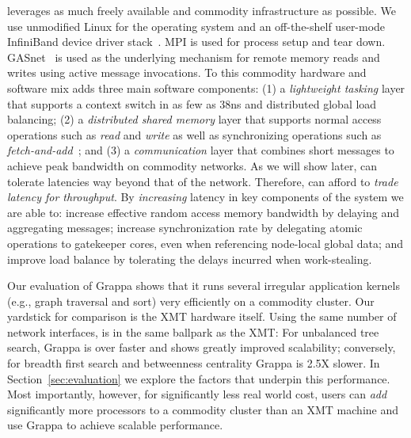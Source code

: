 \Grappa leverages as much freely available and commodity infrastructure as
possible. We use unmodified Linux for the operating system and an
off-the-shelf user-mode InfiniBand device driver stack~\cite{OFED}. MPI is
used for process setup and tear down. GASnet~\cite{gasnet} is used as the
underlying mechanism for remote memory reads and writes using active message
invocations. To this commodity hardware and software mix \Grappa adds three
main software components: (1) a \emph{lightweight tasking\/} layer that
supports a context switch in as few as 38ns and distributed global load
balancing; (2) a \emph{distributed shared memory\/} layer that supports normal
access operations such as \emph{read\/} and \emph{write\/} as well as
synchronizing operations such as \emph{fetch-and-add\/}~\cite{fetchandadd};
and (3) a \emph{communication\/} layer that combines short messages to
achieve peak bandwidth on commodity networks. As we will show later, \Grappa
can tolerate latencies way beyond that of the network. Therefore, \Grappa can
afford to \emph{trade latency for throughput}. By {\em increasing\/} latency
in key components of the system we are able to: increase effective random
access memory bandwidth by delaying and aggregating messages; increase
synchronization rate by delegating atomic operations to gatekeeper cores, even
when referencing node-local global data; and improve load balance by
tolerating the delays incurred when work-stealing.

Our evaluation of Grappa shows that it runs several irregular application
kernels (e.g., graph traversal and sort) very efficiently on a commodity
cluster. Our yardstick for comparison is the XMT hardware itself. Using the
same number of network interfaces, \Grappa is in the same ballpark as the XMT:
For unbalanced tree search, Grappa is over  faster and shows greatly
improved scalability; conversely, for breadth first search and betweenness
centrality Grappa is 2.5X slower. In Section~\ref{sec:evaluation} we explore
the factors that underpin this performance. Most importantly, however, for
significantly less real world cost, users can \emph{add\/} significantly more
processors to a commodity cluster than an XMT machine and use Grappa to
achieve scalable performance. 


